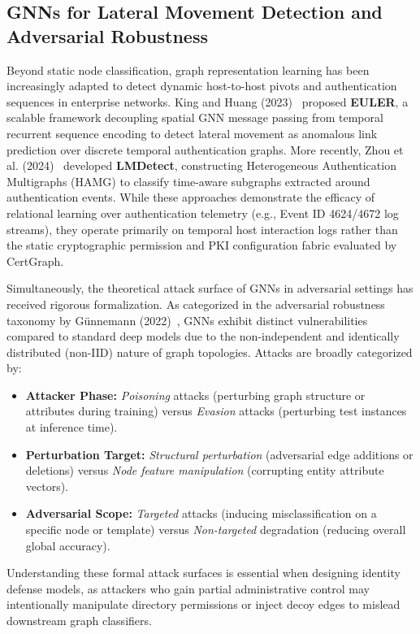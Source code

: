 \subsection{GNNs for Lateral Movement Detection and Adversarial Robustness}
\label{sec:gnn_lateral_adversarial}
Beyond static node classification, graph representation learning has been increasingly adapted to detect dynamic host-to-host pivots and authentication sequences in enterprise networks. King and Huang (2023)~\cite{king2023euler} proposed \textbf{EULER}, a scalable framework decoupling spatial GNN message passing from temporal recurrent sequence encoding to detect lateral movement as anomalous link prediction over discrete temporal authentication graphs. More recently, Zhou et al. (2024)~\cite{zhou2024lateral} developed \textbf{LMDetect}, constructing Heterogeneous Authentication Multigraphs (HAMG) to classify time-aware subgraphs extracted around authentication events. While these approaches demonstrate the efficacy of relational learning over authentication telemetry (e.g., Event ID 4624/4672 log streams), they operate primarily on temporal host interaction logs rather than the static cryptographic permission and PKI configuration fabric evaluated by CertGraph.

Simultaneously, the theoretical attack surface of GNNs in adversarial settings has received rigorous formalization. As categorized in the adversarial robustness taxonomy by Günnemann (2022)~\cite{gunnemann2022adversarial}, GNNs exhibit distinct vulnerabilities compared to standard deep models due to the non-independent and identically distributed (non-IID) nature of graph topologies. Attacks are broadly categorized by:
\begin{itemize}
    \item \textbf{Attacker Phase:} \textit{Poisoning} attacks (perturbing graph structure or attributes during training) versus \textit{Evasion} attacks (perturbing test instances at inference time).
    \item \textbf{Perturbation Target:} \textit{Structural perturbation} (adversarial edge additions or deletions) versus \textit{Node feature manipulation} (corrupting entity attribute vectors).
    \item \textbf{Adversarial Scope:} \textit{Targeted} attacks (inducing misclassification on a specific node or template) versus \textit{Non-targeted} degradation (reducing overall global accuracy).
\end{itemize}
Understanding these formal attack surfaces is essential when designing identity defense models, as attackers who gain partial administrative control may intentionally manipulate directory permissions or inject decoy edges to mislead downstream graph classifiers.

